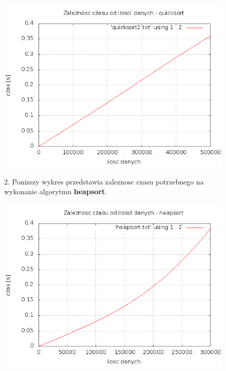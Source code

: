 \documentclass[a4paper,11pt]{report}
\begin{document}
\begin{figure}
\begin{center} \includegraphics[scale=0.55]{./quicksort2.png}\end{center}
  2. Ponizszy wykres przedstawia zaleznosc czasu potrzebnego na wykonanie algorytmu \textbf{heapsort}.
    \begin{center}\includegraphics[scale=0.55]{./heapsort.png}\end{center}
    \end{figure}
\end{document}
